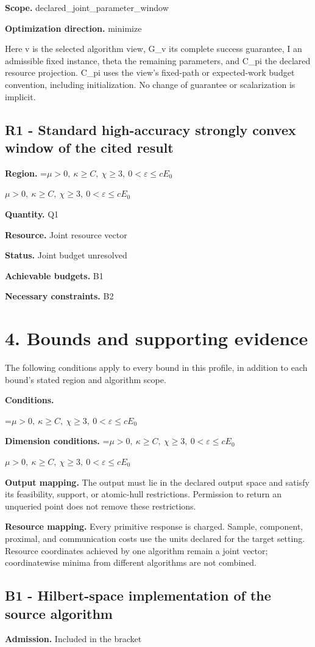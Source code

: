 \documentclass[10pt,a4paper]{article}
\newcommand{\AtlasMath}[1]{\par\begingroup\centering\setbox0=\hbox{$\displaystyle #1$}\ifdim\wd0>1.4\linewidth\typeout{ATLAS WIDE FORMULA: \the\wd0}\fi\ifdim\wd0>\linewidth\resizebox{\linewidth}{!}{\box0}\else\box0\fi\par\endgroup}
\newcommand{\AtlasInlineMath}[1]{\begingroup\setbox0=\hbox{$#1$}\ifdim\wd0>.4\linewidth\endgroup\AtlasMath{#1}\else\endgroup$#1$\fi}
\begin{document}
\textbf{Scope.} declared\_joint\_parameter\_window

\textbf{Optimization direction.} minimize

Here v is the selected algorithm view, G\_v its complete success guarantee, I an admissible fixed instance, theta the remaining parameters, and C\_pi the declared resource projection. C\_pi uses the view's fixed-path or expected-work budget convention, including initialization. No change of guarantee or scalarization is implicit.

\subsection{R1 - Standard high-accuracy strongly convex window of the cited result}
\textbf{Region.} \AtlasInlineMath{\mu>0,\ \kappa\ge C,\ \chi\ge3,\ 0<\varepsilon\le cE_0}

\textbf{Quantity.} Q1

\textbf{Resource.} Joint resource vector

\textbf{Status.} Joint budget unresolved

\textbf{Achievable budgets.} B1

\textbf{Necessary constraints.} B2

\section{4. Bounds and supporting evidence}
The following conditions apply to every bound in this profile, in addition to each bound's stated region and algorithm scope.

\textbf{Conditions.} 
\AtlasMath{\mu>0,\ \kappa\ge C,\ \chi\ge3,\ 0<\varepsilon\le cE_0}


\textbf{Dimension conditions.} \AtlasInlineMath{\mu>0,\ \kappa\ge C,\ \chi\ge3,\ 0<\varepsilon\le cE_0}

\textbf{Output mapping.} The output must lie in the declared output space and satisfy its feasibility, support, or atomic-hull restrictions. Permission to return an unqueried point does not remove these restrictions.

\textbf{Resource mapping.} Every primitive response is charged. Sample, component, proximal, and communication costs use the units declared for the target setting. Resource coordinates achieved by one algorithm remain a joint vector; coordinatewise minima from different algorithms are not combined.

\subsection{B1 - Hilbert-space implementation of the source algorithm}
\textbf{Admission.} Included in the bracket
\end{document}
